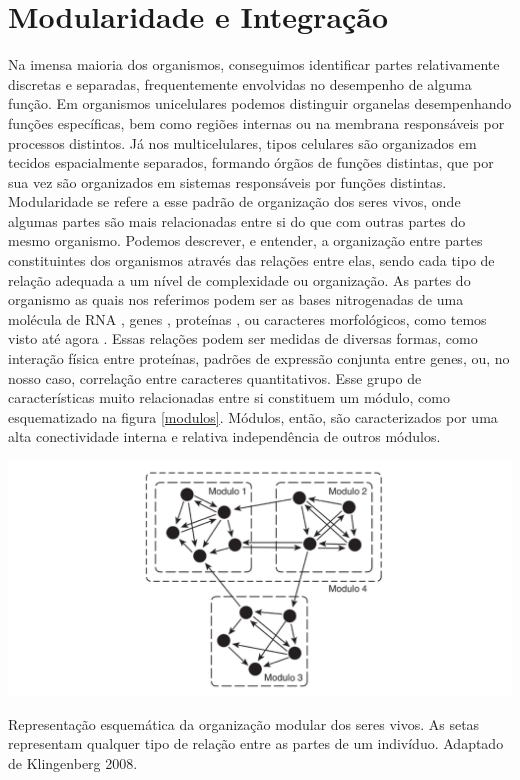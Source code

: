 \documentclass[portuges,]{tufte-handout}
\begin{document}
\section{Modularidade e
Integração}\label{modularidade-e-integrauxe7uxe3o}

Na imensa maioria dos organismos, conseguimos identificar partes
relativamente discretas e separadas, frequentemente envolvidas no
desempenho de alguma função. Em organismos unicelulares podemos
distinguir organelas desempenhando funções específicas, bem como regiões
internas ou na membrana responsáveis por processos distintos. Já nos
multicelulares, tipos celulares são organizados em tecidos espacialmente
separados, formando órgãos de funções distintas, que por sua vez são
organizados em sistemas responsáveis por funções distintas. Modularidade
se refere a esse padrão de organização dos seres vivos, onde algumas
partes são mais relacionadas entre si do que com outras partes do mesmo
organismo. Podemos descrever, e entender, a organização entre partes
constituintes dos organismos através das relações entre elas, sendo cada
tipo de relação adequada a um nível de complexidade ou organização. As
partes do organismo as quais nos referimos podem ser as bases
nitrogenadas de uma molécula de RNA \cite{Ancel2000}, genes
\cite{Costanzo2010}, proteínas \cite{Han2004}, ou caracteres
morfológicos, como temos visto até agora
\cite{Klingenberg2008,Porto2009,Marroig2009}. Essas relações
podem ser medidas de diversas formas, como interação física entre
proteínas, padrões de expressão conjunta entre genes, ou, no nosso caso,
correlação entre caracteres quantitativos. Esse grupo de características
muito relacionadas entre si constituem um módulo, como esquematizado na
figura \ref{modulos}. Módulos, então, são caracterizados por uma alta
conectividade interna e relativa independência de outros módulos.

\begin{marginfigure}
\includegraphics{./figuras/modulos.png}
\caption{Representação esquemática da organização modular dos seres
vivos. As setas representam qualquer tipo de relação entre as partes de
um indivíduo. Adaptado de Klingenberg 2008.}
\label{modulos}
\end{marginfigure}
\end{document}
